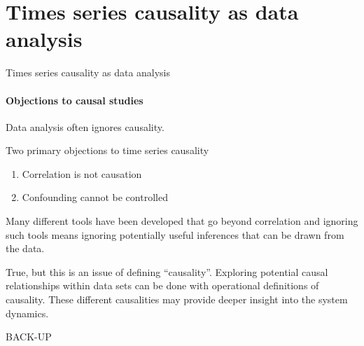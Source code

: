 \documentclass{beamer}
\begin{document}
\section{Times series causality as data analysis}
\begin{frame}{Times series causality as data analysis}
\framesubtitle{Objections to causal studies}
Data analysis often ignores causality.
\vspace{0.2in}
\pause

Two primary objections to time series causality
\begin{enumerate}
\item \alert<3>{Correlation is not causation}
\item \alert<4>{Confounding cannot be controlled}
\end{enumerate}
\vspace{0.2in}
\pause
\alert<3>{Many different tools have been developed that go beyond correlation} and ignoring such tools means ignoring potentially useful inferences that can be drawn from the data.
\vspace{0.15in}

\pause
True, but this is an issue of defining ``causality''.  \alert<4>{Exploring} potential causal relationships within data sets can be done with \alert<4>{operational} definitions of causality.  These different causalities may provide deeper insight into the system dynamics.
\end{frame}

\begin{frame}{}
\end{frame}

\begin{frame}{}
\begin{center}
BACK-UP
\end{center}
\end{frame}
\end{document}
